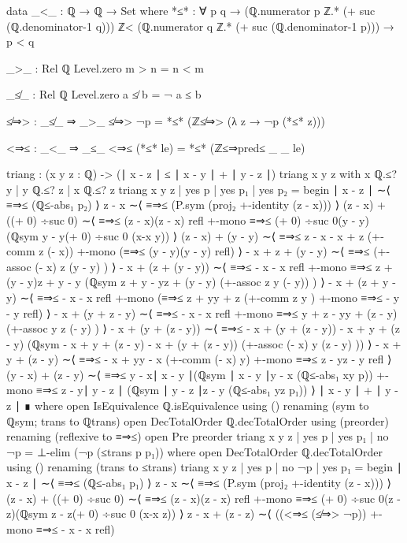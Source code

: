 \documentclass[11pt,a4paper]{article}
\begin{document}
\begin{code}
data _<_ : ℚ → ℚ → Set where
  *≤* : ∀ {p q} →
        (ℚ.numerator p ℤ.* (+ suc (ℚ.denominator-1 q))) ℤ<
        (ℚ.numerator q ℤ.* (+ suc (ℚ.denominator-1 p))) →
        p < q

_>_ : Rel ℚ Level.zero
m > n = n < m

_≰_ : Rel ℚ Level.zero
a ≰ b = ¬ a ≤ b

≰⇒> : _≰_ ⇒ _>_
≰⇒> ¬p = *≤* (ℤ≰⇒> (λ z → ¬p (*≤* z)))

<⇒≤ : _<_ ⇒ _≤_
<⇒≤ (*≤* le) = *≤* (ℤ≤⇒pred≤ _ _ le)

triang : (x y z : ℚ) -> (∣ x - z ∣ ≤ ∣ x - y ∣ + ∣ y - z ∣)
triang x y z with x ℚ.≤? y | y ℚ.≤? z | x ℚ.≤? z
triang x y z | yes p | yes p₁ | yes p₂ = begin
  ∣ x - z ∣   ∼⟨ ≡⇒≤ (ℚ≤-abs₁ p₂)   ⟩
  z - x ∼⟨ ≡⇒≤ (P.sym (proj₂ +-identity (z - x))) ⟩
  (z - x) + ((+ 0) ÷suc 0) ∼⟨  ≡⇒≤ {(z - x)}{(z - x)} refl
  +-mono ≡⇒≤ {(+ 0) ÷suc 0}{(y - y)}
  (ℚsym {y - y}{(+ 0) ÷suc 0} (x-x {y})) ⟩
  (z - x) + (y - y) ∼⟨ ≡⇒≤ {z - x}{ - x + z} (+-comm z (- x))
  +-mono (≡⇒≤ {(y - y)}{(y - y)} refl)   ⟩
  - x + z + (y - y) ∼⟨ ≡⇒≤ (+-assoc (- x) z (y - y) )   ⟩
  - x + (z + (y - y)) ∼⟨ ≡⇒≤ { - x}{ - x} refl
  +-mono ≡⇒≤ {z + (y - y)}{z + y - y}
  (ℚsym {z + y - y}{z + (y - y)} (+-assoc z y (- y)) )   ⟩
  - x + (z + y - y) ∼⟨ ≡⇒≤ { - x}{ - x} refl +-mono
  (≡⇒≤ {z + y}{y + z} (+-comm z y )
  +-mono ≡⇒≤ { - y}{ - y} refl)   ⟩
  - x + (y + z - y) ∼⟨ ≡⇒≤ { - x}{ - x} refl
  +-mono ≡⇒≤ {y + z - y}{y + (z - y)} (+-assoc y z (- y) )   ⟩
  - x + (y + (z - y)) ∼⟨ ≡⇒≤ { - x + (y + (z - y))}{ - x + y + (z - y)}
  (ℚsym { - x + y + (z - y)}{ - x + (y + (z - y))}
  (+-assoc (- x) y (z - y) ))   ⟩
  - x + y + (z - y) ∼⟨ ≡⇒≤ { - x + y}{y - x}
  (+-comm (- x) y) +-mono ≡⇒≤ {z - y}{z - y} refl  ⟩
  (y - x) + (z - y) ∼⟨  ≡⇒≤ {y - x}{∣ x - y ∣}(ℚsym {∣ x - y ∣}{y - x}
  (ℚ≤-abs₁ {x}{y} p)) +-mono ≡⇒≤ {z - y}{∣ y - z ∣}
  (ℚsym {∣ y - z ∣}{z - y} (ℚ≤-abs₁ {y}{z} p₁))   ⟩
  ∣ x - y ∣ + ∣ y - z ∣ ∎
     where
     open IsEquivalence ℚ.isEquivalence using ()
       renaming (sym to ℚsym; trans to ℚtrans)
     open DecTotalOrder ℚ.decTotalOrder using (preorder)
       renaming (reflexive to ≡⇒≤)
     open Pre preorder
triang x y z | yes p | yes p₁ | no ¬p = ⊥-elim (¬p (≤trans p p₁))
  where
  open DecTotalOrder ℚ.decTotalOrder using ()
      renaming (trans to ≤trans)
triang x y z | yes p | no ¬p | yes p₁ = begin 
  ∣ x - z ∣   ∼⟨ ≡⇒≤ (ℚ≤-abs₁ p₁)   ⟩
  z - x ∼⟨ ≡⇒≤ (P.sym (proj₂ +-identity (z - x))) ⟩
  (z - x) + ((+ 0) ÷suc 0) ∼⟨  ≡⇒≤ {(z - x)}{(z - x)} refl +-mono
  ≡⇒≤ {(+ 0) ÷suc 0}{(z - z)}(ℚsym {z - z}{(+ 0) ÷suc 0} (x-x {z})) ⟩
  z - x + (z - z) ∼⟨ ((<⇒≤ (≰⇒> ¬p)) +-mono ≡⇒≤ { - x}{ - x} refl)

\end{code}
\end{document}
